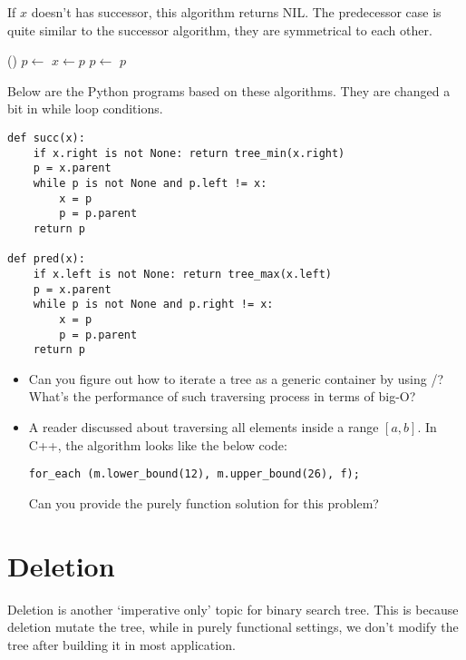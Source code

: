 \documentclass[b5paper]{article}
\begin{document}
If $x$ doesn't has successor, this algorithm returns NIL.
The predecessor case is quite similar to the successor algorithm, they
are symmetrical to each other.

\begin{algorithmic}[1]
    \State \Return {}()
  \Else
    \State $p \gets $ 
      \State $x \gets p$
      \State $p \gets $ 
    \EndWhile
    \State \Return $p$
  \EndIf
\EndFunction
\end{algorithmic}

Below are the Python programs based on these algorithms. They are changed
a bit in while loop conditions.

\lstset{language=Python}
\begin{lstlisting}
def succ(x):
    if x.right is not None: return tree_min(x.right)
    p = x.parent
    while p is not None and p.left != x:
        x = p
        p = p.parent
    return p

def pred(x):
    if x.left is not None: return tree_max(x.left)
    p = x.parent
    while p is not None and p.right != x:
        x = p
        p = p.parent
    return p
\end{lstlisting}

\begin{Exercise}

\begin{itemize}
\item Can you figure out how to iterate a tree as a generic container
by using /? What's the performance of such traversing
process in terms of big-O?

\item A reader discussed about traversing all elements inside a
range $[a, b]$. In C++, the algorithm looks like the below code:

\texttt{for\_each (m.lower\_bound(12), m.upper\_bound(26), f);}

Can you provide the purely function solution for this problem?
\end{itemize}

\end{Exercise}

\section{Deletion}
Deletion is another `imperative only' topic for binary search tree.
This is because deletion mutate the tree, while in purely functional
settings, we don't modify the tree after building it in most
application.
\end{document}
